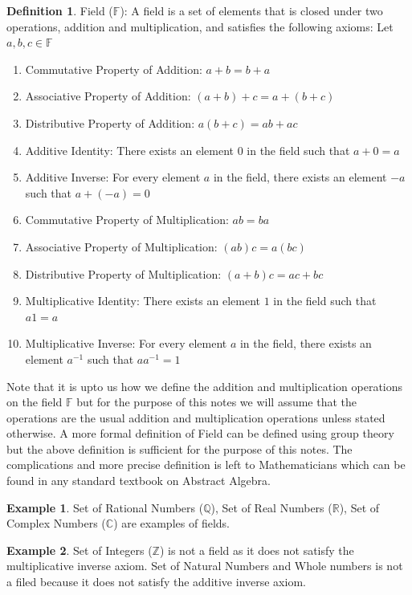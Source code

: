 \documentclass[12pt, oneside]{book}
\theoremstyle{definition}
\newtheorem{definition}{Definition}[section]
\theoremstyle{definition}
\newtheorem{example}{Example}[section]
\theoremstyle{remark}
\begin{document}
\begin{definition}
    Field ($\mathbb{F}$): A field is a set of elements that is closed under two operations, addition and multiplication, and satisfies the following axioms:
    Let $a,b,c\in\mathbb{F}$
    \begin{enumerate}
        \item Commutative Property of Addition: $a+b=b+a$
        \item Associative Property of Addition: $(a+b)+c=a+(b+c)$
        \item Distributive Property of Addition: $a(b+c)=ab+ac$
        \item Additive Identity: There exists an element $0$ in the field such that $a+0=a$
        \item Additive Inverse: For every element $a$ in the field, there exists an element $-a$ such that $a+(-a)=0$
        \item Commutative Property of Multiplication: $ab=ba$
        \item Associative Property of Multiplication: $(ab)c=a(bc)$
        \item Distributive Property of Multiplication: $(a+b)c=ac+bc$
        \item Multiplicative Identity: There exists an element $1$ in the field such that $a1=a$
        \item Multiplicative Inverse: For every element $a$ in the field, there exists an element $a^{-1}$ such that $aa^{-1}=1$
    \end{enumerate}
\end{definition}

Note that it is upto us how we define the addition and multiplication operations on the field $\mathbb{F}$ 
but for the purpose of this notes we will assume that the operations are the usual addition and multiplication operations unless stated otherwise.
A more formal definition of Field can be defined using group theory but the above definition is sufficient for the purpose of this notes.
The complications and more precise definition is left to Mathematicians which can be found in any standard textbook on Abstract Algebra.
\begin{example}
    Set of Rational Numbers ($\mathbb{Q}$), Set of Real Numbers ($\mathbb{R}$),
    Set of Complex Numbers ($\mathbb{C}$) are examples of fields.
\end{example}

\begin{example}
    Set of Integers ($\mathbb{Z}$) is not a field as it does not satisfy the multiplicative inverse axiom.
    Set of Natural Numbers and Whole numbers is not a filed because it does not satisfy the additive inverse axiom.
\end{example}
\end{document}
